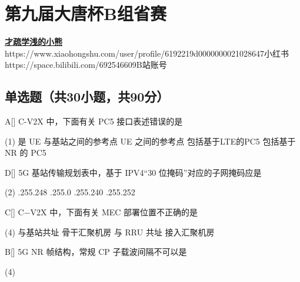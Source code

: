 \chapter{第九届大唐杯B组省赛}
\fancyhead[R]{\color{H6}\kaishu\rightmark\,}

\date{2022年4月10日}{}{\href{https://github.com/xubenshan/dtcup}{\textbf{才疏学浅的小熊}}}
{}
{https://www.xiaohongshu.com/user/profile/6192219d0000000021028647}{小红书}
{https://space.bilibili.com/692546609}{B站账号}



\section{单选题（共30小题，共90分）}



\begin{choice}{A}[]
    C-V2X 中，下面有关 PC5 接口表述错误的是
    \begin{tasks}(1)
        \task 是 UE 与基站之间的参考点
        \task   UE 之间的参考点
        \task  包括基于LTE的PC5
        \task 包括基于 NR 的 PC5
    \end{tasks}
\end{choice}


\begin{choice}{D}[]
    5G 基站传输规划表中，基于 IPV4“30 位掩码”对应的子网掩码应是
    \begin{tasks}(2)
        .255.248
        .255.0
        .255.240
        .255.252
    \end{tasks}
\end{choice}




\begin{choice}{C}[]
    C−V2X 中，下面有关 MEC 部署位置不正确的是
    \begin{tasks}(4)
        \task 与基站共址
        \task 骨干汇聚机房
        \task 与 RRU 共址
        \task 接入汇聚机房
    \end{tasks}
\end{choice}




\begin{choice}{B}[]
    5G NR 帧结构，常规 CP 子载波间隔不可以是
    \begin{tasks}(4)
    \end{tasks}
\end{choice}


